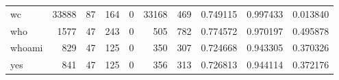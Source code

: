 \begin{tabular}{lrrrrrrrrr}
wc        &                               33888 &                                              87 &                                            164 &                                             0 &                                          33168 &                                          469 &                                           0.749115 &                               0.997433 &                             0.013840 \\
who       &                                1577 &                                              47 &                                            243 &                                             0 &                                            505 &                                          782 &                                           0.774572 &                               0.970197 &                             0.495878 \\
whoami    &                                 829 &                                              47 &                                            125 &                                             0 &                                            350 &                                          307 &                                           0.724668 &                               0.943305 &                             0.370326 \\
yes       &                                 841 &                                              47 &                                            125 &                                             0 &                                            356 &                                          313 &                                           0.726813 &                               0.944114 &                             0.372176 \\
\bottomrule
\end{tabular}

